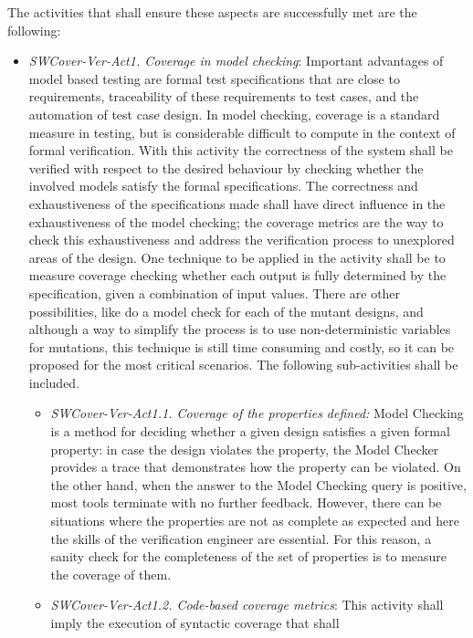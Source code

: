 The activities that shall ensure these aspects are successfully met
are the following:

\begin{itemize}
\item {\it SWCover-Ver-Act1. Coverage in model checking}: Important
  advantages of model based testing are formal test specifications
  that are close to requirements, traceability of these requirements
  to test cases, and the automation of test case design. In model
  checking, coverage is a standard measure in testing, but is
  considerable difficult to compute in the context of formal
  verification. With this activity the correctness of the system shall
  be verified with respect to the desired behaviour by checking
  whether the involved models satisfy the formal specifications. The
  correctness and exhaustiveness of the specifications made shall have
  direct influence in the exhaustiveness of the model checking; the
  coverage metrics are the way to check this exhaustiveness and
  address the verification process to unexplored areas of the
  design. One technique to be applied in the activity shall be to
  measure coverage checking whether each output is fully determined by
  the specification, given a combination of input values. There are
  other possibilities, like do a model check for each of the mutant
  designs, and although a way to simplify the process is to use
  non-deterministic variables for mutations, this technique is still
  time consuming and costly, so it can be proposed for the most
  critical scenarios.  The following sub-activities shall be included.
\begin{itemize}
\item {\it SWCover-Ver-Act1.1. Coverage of the properties defined:}
  Model Checking is a method for deciding whether a given design
  satisfies a given formal property: in case the design violates the
  property, the Model Checker provides a trace that demonstrates how
  the property can be violated. On the other hand, when the answer to
  the Model Checking query is positive, most tools terminate with no
  further feedback. However, there can be situations where the
  properties are not as complete as expected and here the skills of
  the verification engineer are essential. For this reason, a sanity
  check for the completeness of the set of properties is to measure
  the coverage of them.
\item {\it SWCover-Ver-Act1.2. Code-based coverage metrics}: This
  activity shall imply the execution of syntactic coverage that shall

\end{itemize}
\end{itemize}
